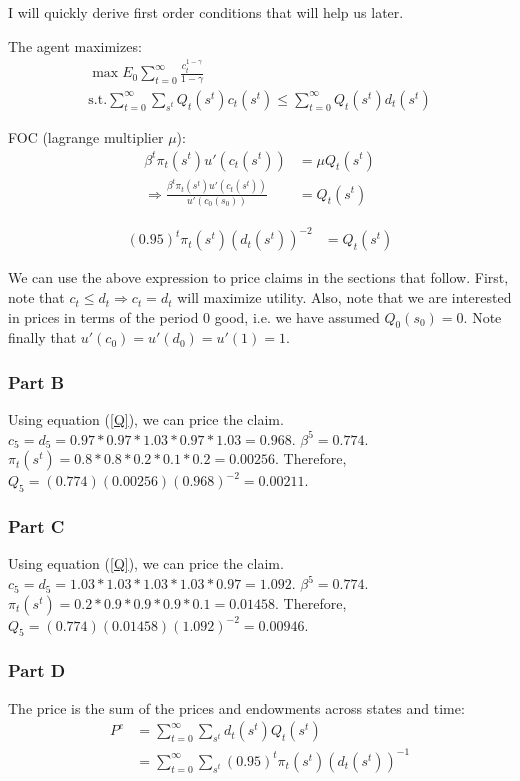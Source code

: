 \documentclass[11pt]{article} %
\begin{document}
I will quickly derive first order conditions that will help us later.

The agent maximizes:
\begin{align*}
\max E_0 \sum_{t=0}^{\infty}\frac{c_t^{1-\gamma}}{1-\gamma}\\
\text{s.t.} \sum_{t=0}^{\infty}\sum_{s^t}Q_t(s^t)c_t(s^t) \leq \sum_{t=0}^{\infty}Q_t(s^t)d_t(s^t)
\end{align*}

FOC (lagrange multiplier $\mu$):
\begin{align*}
\beta^t\pi_t(s^t)u'(c_t(s^t)) &= \mu Q_t(s^t)\\
\Rightarrow \frac{\beta^t \pi_t(s^t)u'(c_t(s^t))}{u'(c_0(s_0))} &= Q_{t}(s^t)
\end{align*}

\begin{align}
(0.95)^t \pi_t(s^t)(d_t(s^t))^{-2} &=  Q_{t}(s^t) \label{Q}
\end{align}

We can use the above expression to price claims in the sections that follow. First, note that $c_t\leq d_t \Rightarrow c_t = d_t$ will maximize utility. Also, note that we are interested in prices in terms of the period $0$ good, i.e. we have assumed $Q_0(s_0) = 0.$ Note finally that $u'(c_0) = u'(d_0) = u'(1) = 1.$
\subsubsection{Part B}
Using equation (\ref{Q}), we can price the claim. $c_5 = d_5 = 0.97*0.97*1.03*0.97*1.03 = 0.968$. $\beta^5 = 0.774$. $\pi_t(s^t) = 0.8*0.8*0.2*0.1*0.2 = 0.00256$. Therefore, $Q_5 = ( 0.774)(0.00256)(0.968)^{-2} = 0.00211$.
\subsubsection{Part C}
Using equation (\ref{Q}), we can price the claim. $c_5 = d_5 = 1.03*1.03*1.03*1.03*0.97 = 1.092$. $\beta^5 = 0.774$. $\pi_t(s^t) = 0.2*0.9*0.9*0.9*0.1 = 0.01458$. Therefore, $Q_5 =  ( 0.774)(0.01458)(1.092)^{-2} = 0.00946$.
\subsubsection{Part D}
The price is the sum of the prices and endowments across states and time:
\begin{align*}
P^e &= \sum_{t=0}^{\infty}\sum_{s^t} d_t(s^t)Q_{t}(s^t)\\
&= \sum_{t=0}^{\infty}\sum_{s^t} (0.95)^t \pi_t(s^t)(d_t(s^t))^{-1}
\end{align*} 
\end{document}
